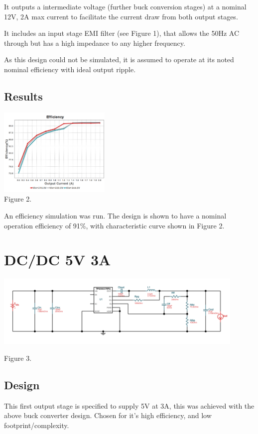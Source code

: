 \documentclass[11pt, a4]{article}
\begin{document}
It outputs a intermediate voltage (further buck conversion stages) at a nominal 12V, 2A max current to facilitate the current draw from both output stages.

It includes an input stage EMI filter (see Figure 1), that allows the 50Hz AC through but has a high impedance to any higher frequency.

As this design could not be simulated, it is assumed to operate at its noted nominal efficiency with ideal output ripple.
\subsection{Results}
\begin{center}
        \includegraphics[width=0.4\textwidth]{img/acdc_eff.png} \\
        Figure 2.
\end{center}

An efficiency simulation was run. The design is shown to have a nominal operation efficiency of 91\%, with characteristic curve shown in Figure 2.

\section{DC/DC 5V 3A}
\includegraphics[width=0.9\textwidth]{img/dcdc5V.png}
\begin{center}
        Figure 3.
\end{center}
\subsection{Design}
This first output stage is specified to supply 5V at 3A, this was achieved with the above buck converter design. Chosen for it's high efficiency, and low footprint/complexity.
\end{document}

